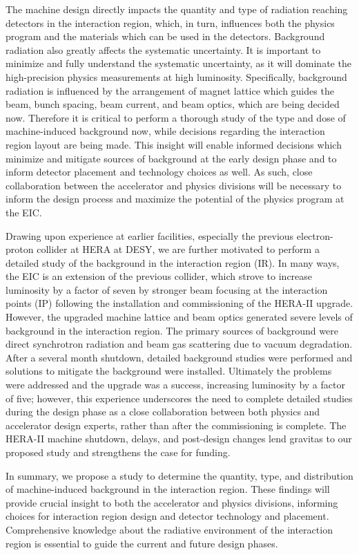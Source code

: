 
The machine design directly impacts the quantity and type of radiation reaching detectors in the interaction region, which, in turn, influences both the physics program and the materials which can be used in the detectors.  Background radiation also greatly affects the systematic uncertainty.  It is important to minimize and fully understand the systematic uncertainty, as it will dominate the high-precision physics measurements at high luminosity.  Specifically, background radiation is influenced by the arrangement of magnet lattice which guides the beam, bunch spacing, beam current, and beam optics, which are being decided now.  Therefore it is critical to perform a thorough study of the type and dose of machine-induced background now, while decisions regarding the interaction region layout are being made.  This insight will enable informed decisions which minimize and mitigate sources of background at the early design phase and to inform detector placement and technology choices as well.  As such, close collaboration between the accelerator and physics divisions will be necessary to inform the design process and maximize the potential of the physics program at the EIC.

Drawing upon experience at earlier facilities, especially the previous electron-proton collider at HERA at DESY, we are further motivated to perform a detailed study of the background in the interaction region (IR).  In many ways, the EIC is an extension of the previous collider, which strove to increase luminosity by a factor of seven by stronger beam focusing at the interaction points (IP) following the installation and commissioning of the HERA-II upgrade.  However, the upgraded machine lattice and beam optics generated severe levels of background in the interaction region.  The primary sources of background were direct synchrotron radiation and beam gas scattering due to vacuum degradation.  After a several month shutdown, detailed background studies were performed and solutions to mitigate the background were installed.  Ultimately the problems were addressed and the upgrade was a success, increasing luminosity by a factor of five; however, this experience underscores the need to complete detailed studies during the design phase as a close collaboration between both physics and accelerator design experts, rather than after the commissioning is complete.  The HERA-II machine shutdown, delays, and post-design changes lend gravitas to our proposed study and strengthens the case for funding.

In summary, we propose a study to determine the quantity, type, and distribution of machine-induced background in the interaction region.  These findings will provide crucial insight to both the accelerator and physics divisions, informing choices for interaction region design and detector technology and placement.  Comprehensive knowledge about the radiative environment of the interaction region is essential to guide the current and future design phases.

